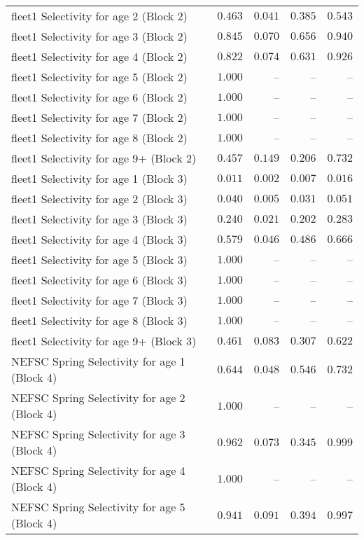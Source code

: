 \documentclass[
]{article}
\begin{document}
\begin{landscape}
\begin{longtable}[t]{lrrrr}
fleet1 Selectivity for age 2 (Block 2) & $0.463$ & $0.041$ & $0.385$ & $0.543$\\
\addlinespace
fleet1 Selectivity for age 3 (Block 2) & $0.845$ & $0.070$ & $0.656$ & $0.940$\\
fleet1 Selectivity for age 4 (Block 2) & $0.822$ & $0.074$ & $0.631$ & $0.926$\\
fleet1 Selectivity for age 5 (Block 2) & $1.000$ & -- & -- & --\\
fleet1 Selectivity for age 6 (Block 2) & $1.000$ & -- & -- & --\\
fleet1 Selectivity for age 7 (Block 2) & $1.000$ & -- & -- & --\\
\addlinespace
fleet1 Selectivity for age 8 (Block 2) & $1.000$ & -- & -- & --\\
fleet1 Selectivity for age 9+ (Block 2) & $0.457$ & $0.149$ & $0.206$ & $0.732$\\
fleet1 Selectivity for age 1 (Block 3) & $0.011$ & $0.002$ & $0.007$ & $0.016$\\
fleet1 Selectivity for age 2 (Block 3) & $0.040$ & $0.005$ & $0.031$ & $0.051$\\
fleet1 Selectivity for age 3 (Block 3) & $0.240$ & $0.021$ & $0.202$ & $0.283$\\
\addlinespace
fleet1 Selectivity for age 4 (Block 3) & $0.579$ & $0.046$ & $0.486$ & $0.666$\\
fleet1 Selectivity for age 5 (Block 3) & $1.000$ & -- & -- & --\\
fleet1 Selectivity for age 6 (Block 3) & $1.000$ & -- & -- & --\\
fleet1 Selectivity for age 7 (Block 3) & $1.000$ & -- & -- & --\\
fleet1 Selectivity for age 8 (Block 3) & $1.000$ & -- & -- & --\\
\addlinespace
fleet1 Selectivity for age 9+ (Block 3) & $0.461$ & $0.083$ & $0.307$ & $0.622$\\
NEFSC Spring Selectivity for age 1 (Block 4) & $0.644$ & $0.048$ & $0.546$ & $0.732$\\
NEFSC Spring Selectivity for age 2 (Block 4) & $1.000$ & -- & -- & --\\
NEFSC Spring Selectivity for age 3 (Block 4) & $0.962$ & $0.073$ & $0.345$ & $0.999$\\
NEFSC Spring Selectivity for age 4 (Block 4) & $1.000$ & -- & -- & --\\
\addlinespace
NEFSC Spring Selectivity for age 5 (Block 4) & $0.941$ & $0.091$ & $0.394$ & $0.997$\\

\end{longtable}
\end{landscape}
\end{document}
